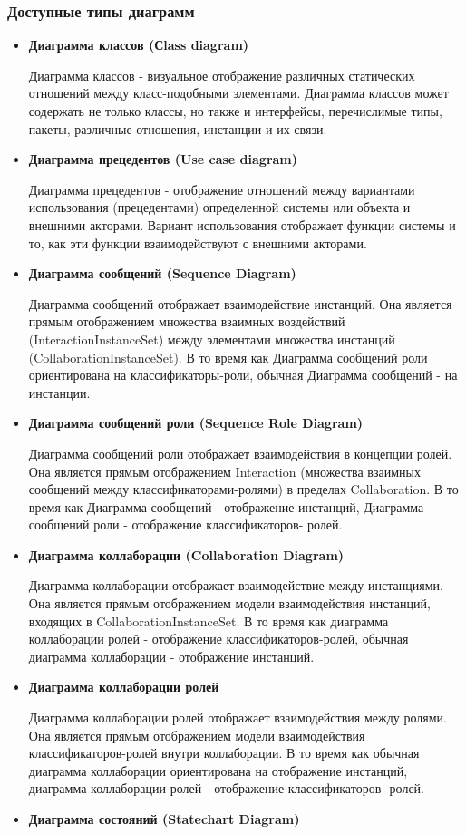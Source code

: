 \documentclass[a4paper,12pt]{report}
\begin{document}
\subsubsection*{Доступные типы диаграмм}
\begin{itemize}
 
\item \textbf{Диаграмма классов (Сlass diagram)}

Диаграмма классов - визуальное отображение различных статических отношений между
класс-подобными элементами. Диаграмма классов может содержать не только классы, но
также и интерфейсы, перечислимые типы, пакеты, различные отношения, инстанции и их
связи.
\item \textbf{Диаграмма прецедентов (Use case diagram)}

Диаграмма прецедентов - отображение отношений между вариантами использования
(прецедентами) определенной системы или объекта и внешними акторами. Вариант
использования отображает функции системы и то, как эти функции взаимодействуют с
внешними акторами.
\item \textbf{Диаграмма сообщений (Sequence Diagram)}

Диаграмма сообщений отображает взаимодействие инстанций. Она является прямым отображением множества взаимных воздействий (InteractionInstanceSet) между элементами
множества инстанций (CollaborationInstanceSet). В то время как Диаграмма сообщений роли
ориентирована на классификаторы-роли, обычная Диаграмма сообщений - на инстанции.
\item \textbf{Диаграмма сообщений роли (Sequence Role Diagram)}

Диаграмма сообщений роли отображает взаимодействия в концепции ролей. Она является
прямым отображением Interaction (множества взаимных сообщений между
классификаторами-ролями) в пределах Collaboration. В то время как Диаграмма сообщений
- отображение инстанций, Диаграмма сообщений роли - отображение классификаторов-
ролей.
\item \textbf{Диаграмма коллаборации (Collaboration Diagram)}

 Диаграмма коллаборации отображает взаимодействие между инстанциями. Она является
прямым отображением модели взаимодействия инстанций, входящих в CollaborationInstanceSet. В то время как диаграмма коллаборации ролей - отображение
классификаторов-ролей, обычная диаграмма коллаборации - отображение инстанций.
\item \textbf{Диаграмма коллаборации ролей}

Диаграмма коллаборации ролей отображает взаимодействия между ролями. Она является
прямым отображением модели взаимодействия классификаторов-ролей внутри
коллаборации. В то время как обычная диаграмма коллаборации ориентирована на
отображение инстанций, диаграмма коллаборации ролей - отображение классификаторов-
ролей.
\item\textbf{ Диаграмма состояний (Statechart Diagram)}


\end{itemize}
\end{document}
